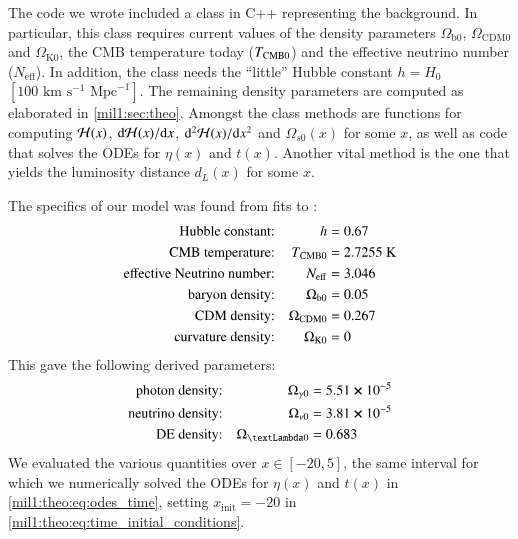 

The code we wrote included a class in C++ representing the background. In particular, this class requires current values of the density parameters $\Omega_{\mathrm{b}0}$, $\Omega_{\mathrm{CDM}0}$ and $\Omega_{\mathrm{K}0}$, the CMB temperature today ($T_{\mathrm{CMB}0}$) and the effective neutrino number ($N_\mathrm{eff}$). In addition, the class needs the ``little'' Hubble constant $h=H_0$~$[100\text{~km}\text{~s}^{-1}\text{~Mpc}^{-1}]$. The remaining density parameters are computed as elaborated in \cref{mil1:sec:theo}. Amongst the class methods are functions for computing $\mathcal{H}(x)$, $\mathrm{d}\mathcal{H}(x)/\mathrm{d} x$, $\mathrm{d}^2\mathcal{H}(x)/\mathrm{d} x^2$ and $\Omega_{s0}(x)$ for some $x$, as well as code that solves the ODEs for $\eta(x)$ and $t(x)$. Another vital method is the one that yields the luminosity distance $d_L(x)$ for some $x$.


The specifics of our model was found from fits to \citep{Planckdata}:
\begin{equation}\label{mil1:imp:eq:fiducials}
    \begin{split}
        \text{Hubble constant:}&& h &=0.67 \\
        \text{CMB temperature:}&& \TCMB &=2.7255\text{~K} \\
        \text{effective Neutrino number:}&& N_{\mathrm{eff}}&=3.046\\
        \text{baryon density:}&& \Omega_{\mathrm{b}0}&=0.05\\
        \text{CDM density:}&& \Omega_{\mathrm{CDM}0}&=0.267\\
        \text{curvature density:}&& \OmgK&=0
    \end{split}
\end{equation}
This gave the following derived parameters:
\begin{equation}\label{mil1:imp:eq:derived_fiducials}
    \begin{split}
        \text{photon density:}&& \Omega_{\gamma 0}&=5.51 \cross 10^{-5}\\
        \text{neutrino density:}&& \Omega_{\nu 0}&=3.81 \cross 10^{-5}\\
        \text{DE density:}&& \OmgL&=0.683
    \end{split}
\end{equation}
We evaluated the various quantities over $x \in [-20, 5]$, the same interval for which we numerically solved the ODEs for $\eta(x)$ and $t(x)$ in \cref{mil1:theo:eq:odes_time}, setting $x_\mathrm{init}=-20$ in \cref{mil1:theo:eq:time_initial_conditions}. 

